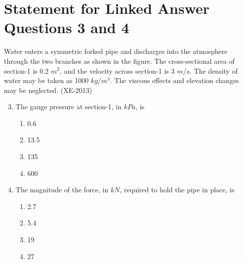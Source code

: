 \documentclass[journal]{IEEEtran}
\numberwithin{equation}{enumi}
\numberwithin{figure}{enumi}
\begin{document}
\section*{Statement for Linked Answer Questions 3 and 4} \label{sec:linked_questions_3_4}
Water enters a symmetric forked pipe and discharges into the atmosphere through the two branches as shown in the figure. The cross-sectional area of section-1 is 0.2 $m^2$, and the velocity across section-1 is 3 $m/s$. The density of water may be taken as 1000 $kg/m^3$. The viscous effects and elevation changes may be neglected. \hfill(XE-2013)



\begin{enumerate}
    \setcounter{enumi}{2} %
    \item The gauge pressure at section-1, in $kPa$, is 
    \begin{multicols}{4}
        \begin{enumerate}
            \item 0.6
            \item 13.5
            \item 135
            \item 600
        \end{enumerate}
    \end{multicols}

    \item The magnitude of the force, in $kN$, required to hold the pipe in place, is
    \begin{multicols}{4}
        \begin{enumerate}
            \item 2.7
            \item 5.4
            \item 19
            \item 27
        \end{enumerate}
    \end{multicols}
\end{enumerate}




    
\end{document}
